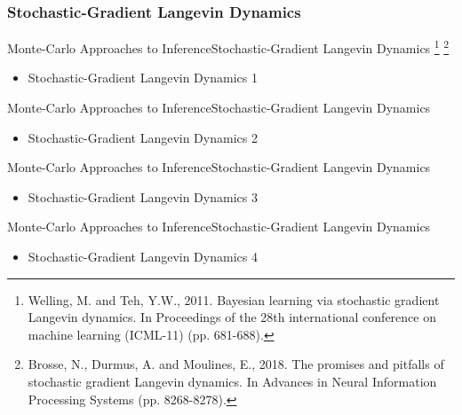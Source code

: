 \documentclass[AERbeamer%
              ,optEnglish%
              ,optBiber%
              ,optBibstyleAlphabetic%
              ,optBeamerClassicFormat%
              ]{AERlatex}%
\begin{document}
\subsubsection*{Stochastic-Gradient Langevin Dynamics}
\begin{frame}[c]{Monte-Carlo Approaches to Inference}{Stochastic-Gradient Langevin Dynamics \footnote{Welling, M. and Teh, Y.W., 2011. Bayesian learning via stochastic gradient Langevin
                                                                                                      dynamics. In Proceedings of the 28th international conference on machine learning
                                                                                                      (ICML-11) (pp. 681-688).}
                                                                                            \footnote{Brosse, N., Durmus, A. and Moulines, E., 2018. The promises and pitfalls of stochastic
                                                                                                      gradient Langevin dynamics. In Advances in Neural Information Processing Systems (pp. 8268-8278).}}
    \centering
    \begin{itemize}
        \item Stochastic-Gradient Langevin Dynamics 1
    \end{itemize}
\end{frame}


\begin{frame}[c]{Monte-Carlo Approaches to Inference}{Stochastic-Gradient Langevin Dynamics}
    \centering
    \begin{itemize}
        \item Stochastic-Gradient Langevin Dynamics 2
    \end{itemize}
\end{frame}


\begin{frame}[c]{Monte-Carlo Approaches to Inference}{Stochastic-Gradient Langevin Dynamics}
    \centering
    \begin{itemize}
        \item Stochastic-Gradient Langevin Dynamics 3
    \end{itemize}
\end{frame}


\begin{frame}[c]{Monte-Carlo Approaches to Inference}{Stochastic-Gradient Langevin Dynamics}
    \centering
    \begin{itemize}
        \item Stochastic-Gradient Langevin Dynamics 4
    \end{itemize}
\end{frame}
\end{document}
